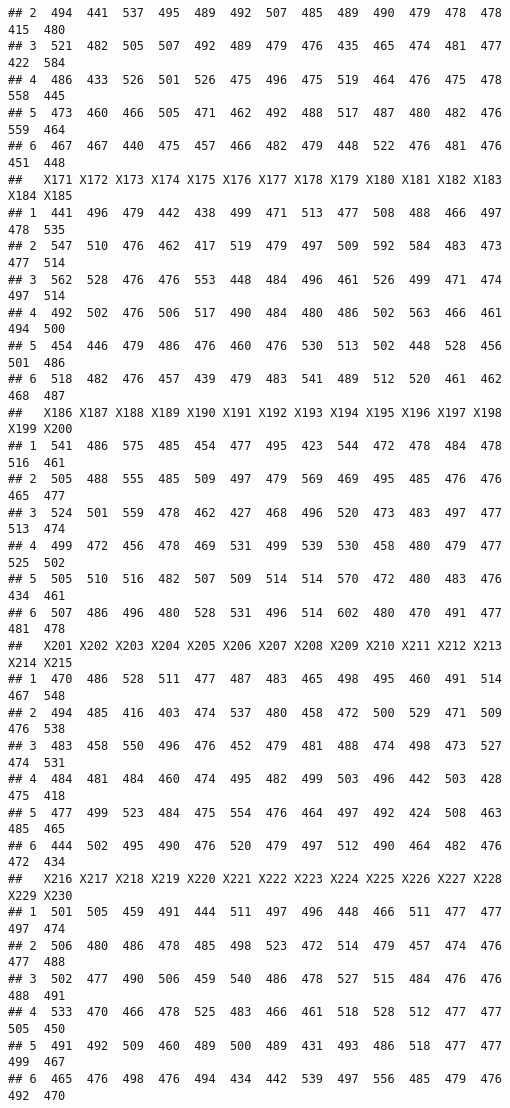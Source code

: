 \documentclass[
]{article}
\begin{document}
\begin{verbatim}
## 2  494  441  537  495  489  492  507  485  489  490  479  478  478  415  480
## 3  521  482  505  507  492  489  479  476  435  465  474  481  477  422  584
## 4  486  433  526  501  526  475  496  475  519  464  476  475  478  558  445
## 5  473  460  466  505  471  462  492  488  517  487  480  482  476  559  464
## 6  467  467  440  475  457  466  482  479  448  522  476  481  476  451  448
##   X171 X172 X173 X174 X175 X176 X177 X178 X179 X180 X181 X182 X183 X184 X185
## 1  441  496  479  442  438  499  471  513  477  508  488  466  497  478  535
## 2  547  510  476  462  417  519  479  497  509  592  584  483  473  477  514
## 3  562  528  476  476  553  448  484  496  461  526  499  471  474  497  514
## 4  492  502  476  506  517  490  484  480  486  502  563  466  461  494  500
## 5  454  446  479  486  476  460  476  530  513  502  448  528  456  501  486
## 6  518  482  476  457  439  479  483  541  489  512  520  461  462  468  487
##   X186 X187 X188 X189 X190 X191 X192 X193 X194 X195 X196 X197 X198 X199 X200
## 1  541  486  575  485  454  477  495  423  544  472  478  484  478  516  461
## 2  505  488  555  485  509  497  479  569  469  495  485  476  476  465  477
## 3  524  501  559  478  462  427  468  496  520  473  483  497  477  513  474
## 4  499  472  456  478  469  531  499  539  530  458  480  479  477  525  502
## 5  505  510  516  482  507  509  514  514  570  472  480  483  476  434  461
## 6  507  486  496  480  528  531  496  514  602  480  470  491  477  481  478
##   X201 X202 X203 X204 X205 X206 X207 X208 X209 X210 X211 X212 X213 X214 X215
## 1  470  486  528  511  477  487  483  465  498  495  460  491  514  467  548
## 2  494  485  416  403  474  537  480  458  472  500  529  471  509  476  538
## 3  483  458  550  496  476  452  479  481  488  474  498  473  527  474  531
## 4  484  481  484  460  474  495  482  499  503  496  442  503  428  475  418
## 5  477  499  523  484  475  554  476  464  497  492  424  508  463  485  465
## 6  444  502  495  490  476  520  479  497  512  490  464  482  476  472  434
##   X216 X217 X218 X219 X220 X221 X222 X223 X224 X225 X226 X227 X228 X229 X230
## 1  501  505  459  491  444  511  497  496  448  466  511  477  477  497  474
## 2  506  480  486  478  485  498  523  472  514  479  457  474  476  477  488
## 3  502  477  490  506  459  540  486  478  527  515  484  476  476  488  491
## 4  533  470  466  478  525  483  466  461  518  528  512  477  477  505  450
## 5  491  492  509  460  489  500  489  431  493  486  518  477  477  499  467
## 6  465  476  498  476  494  434  442  539  497  556  485  479  476  492  470

\end{verbatim}
\end{document}

